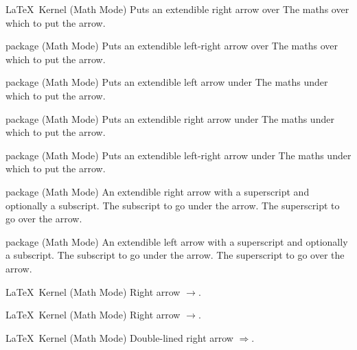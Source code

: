 %
 {}%
 {\LaTeX\ Kernel (Math Mode)}%
 {Puts an extendible right arrow over }%
 {%
   \BeginArgList
      The maths over which to put the arrow.
   \EndArgList
 }

%
 {}%
 { package (Math Mode)}%
 {Puts an extendible left-right arrow over }%
 {%
   \BeginArgList
      The maths over which to put the arrow.
   \EndArgList
 }

%
 {}%
 { package (Math Mode)}%
 {Puts an extendible left arrow under }%
 {%
   \BeginArgList
      The maths under which to put the arrow.
   \EndArgList
 }

%
 {}%
 { package (Math Mode)}%
 {Puts an extendible right arrow under }%
 {%
   \BeginArgList
      The maths under which to put the arrow.
   \EndArgList
 }

%
 {}%
 { package (Math Mode)}%
 {Puts an extendible left-right arrow under }%
 {%
   \BeginArgList
      The maths under which to put the arrow.
   \EndArgList
 }

%
 {}%
 { package (Math Mode)}%
 {An extendible right arrow with a superscript and optionally a
  subscript.}%
 {%
   \BeginArgList
      The subscript to go under the arrow.
      The superscript to go over the arrow.
   \EndArgList
 }

%
 {}%
 { package (Math Mode)}%
 {An extendible left arrow with a superscript and optionally a
  subscript.}%
 {%
   \BeginArgList
      The subscript to go under the arrow.
      The superscript to go over the arrow.
   \EndArgList
 }

%
 {}%
 {\LaTeX\ Kernel (Math Mode)}%
 {Right arrow \ensuremath{\rightarrow}.}%
 {}

%
 {}%
 {\LaTeX\ Kernel (Math Mode)}%
 {Right arrow \ensuremath{\to}.}%
 {}

%
 {}%
 {\LaTeX\ Kernel (Math Mode)}%
 {Double-lined right arrow \ensuremath{\Rightarrow}.}%
 {}

